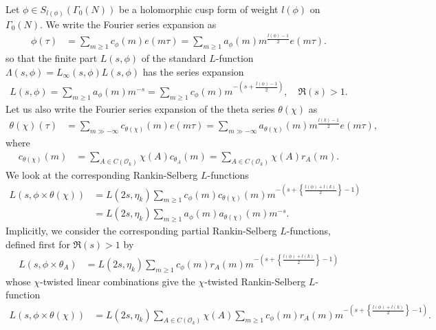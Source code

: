 \documentclass{amsart}
\theoremstyle{definition}
\theoremstyle{definition}
\theoremstyle{definition}
\begin{document}
Let $\phi \in S_{l(\phi)}(\Gamma_0(N))$ be a holomorphic cusp form of weight $l(\phi)$ on $\Gamma_0(N)$. We write the Fourier series expansion as 
\begin{align*} \phi(\tau) &= \sum\limits_{ m \geq 1} c_{\phi}(m) e(m \tau) = \sum\limits_{m \geq 1} a_{\phi}(m) m^{\frac{l(\phi)-1}{2}} e(m \tau). \end{align*}
so that the finite part $L(s, \phi)$ of the standard $L$-function $\Lambda(s, \phi) = L_{\infty}(s, \phi) L(s, \phi)$ has the series expansion 
\begin{align*} L(s, \phi) = \sum_{m \geq 1} a_{\phi}(m)m^{-s} = \sum_{m \geq 1} c_{\phi}(m) m^{-(s + \frac{l(\phi)-1}{2})}, \quad \Re(s)>1. \end{align*}
Let us also write the Fourier series expansion of the theta series $\theta(\chi)$ as 
\begin{align*} \theta(\chi)(\tau) &= \sum\limits_{m \gg - \infty} c_{\theta(\chi)}(m) e(m \tau) 
= \sum\limits_{m \gg - \infty} a_{\theta(\chi)}(m)m^{\frac{l(k)-1}{2}} e(m \tau), \end{align*}
where
\begin{align*} c_{\theta(\chi)}(m) &= \sum\limits_{A \in C(\mathcal{O}_k)} \chi(A) c_{\theta_A}(m) = \sum\limits_{A \in C(\mathcal{O}_k)} \chi(A) r_A(m). \end{align*}
We look at the corresponding Rankin-Selberg $L$-functions %
\begin{align*} L(s, \phi \times \theta(\chi)) 
&= L(2s, \eta_k) \sum\limits_{m \geq 1} c_{\phi}(m) c_{\theta(\chi)}(m) m^{ - \left( s + \left\lbrace \frac{l(\phi) + l(k) }{2}  \right\rbrace -1 \right)} \\
&= L(2s, \eta_k) \sum\limits_{m \geq 1} a_{\phi}(m) a_{\theta(\chi)}(m) m^{-s}. \end{align*}
Implicitly, we consider the corresponding partial Rankin-Selberg $L$-functions, defined first for $\Re(s) > 1$ by 
\begin{align*} L(s, \phi \times \theta_A) &= 
L(2s, \eta_k) \sum\limits_{m \geq 1} c_{\phi}(m) r_A(m) m^{ - \left( s + \left\lbrace \frac{l(\phi) + l(k) }{2}  \right\rbrace -1 \right)} \end{align*}
whose $\chi$-twisted linear combinations give the $\chi$-twisted Rankin-Selberg $L$-function 
\begin{align*} L(s, \phi \times \theta(\chi)) &= L(2s, \eta_k) \sum\limits_{A \in C(\mathcal{O}_k)} \chi(A) \sum\limits_{m \geq 1} c_{\phi}(m) r_A(m) 
m^{ - \left( s + \left\lbrace \frac{l(\phi) + l(k) }{2}  \right\rbrace -1 \right)}. \end{align*}
\end{document}
